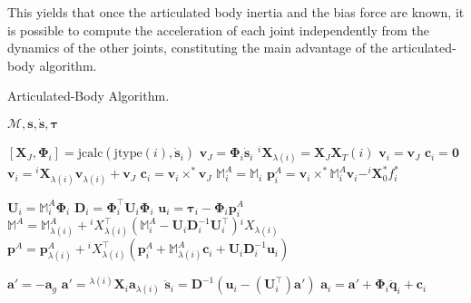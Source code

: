 This yields that once the articulated body inertia and the bias force are known, it is possible to compute the acceleration of each joint independently from the dynamics of the other joints, constituting the main advantage of the articulated-body algorithm.

\begin{algorithm}[h]
    \caption{Articulated-Body Algorithm.}
    \label{alg:aba}
    \begin{algorithmic}[1]
        \Require $\mathcal{M}, \mathbf{s}, \dot{\mathbf{s}}, \boldsymbol{\tau}$

        \State $[\mathbf{X}_J, \boldsymbol{\Phi}_i] = \text{jcalc}(\text{jtype}(i), \dot{\mathbf{s}}_i)$
        \State $\mathrm{\mathbf{v}}_J = \boldsymbol{\Phi}_i \dot{\mathbf{s}}_i$
        \State $^i\mathbf{X}_{\lambda(i)} = \mathbf{X}_J\mathbf{X}_T (i)$
        \State $\mathrm{\mathbf{v}}_i = \mathrm{\mathbf{v}}_J$
        \State $\mathbf{c}_i = \mathbf{0}$
        \Else
        \State $\mathrm{\mathbf{v}}_i = {}^i\mathbf{X} _{\lambda(i)}\mathrm{\mathbf{v}}_{\lambda(i)} + \mathrm{\mathbf{v}}_J$
        \State $\mathbf{c}_i = \mathrm{\mathbf{v}}_i \times ^* \mathrm{\mathbf{v}}_J$
        \EndIf
        \State $\mathbb{M}_i ^A = \mathbb{M}_i$
        \State $\mathbf{p}_i ^A = \mathrm{\mathbf{v}}_i \times^* \mathbb{M}_i ^A \mathrm{\mathbf{v}}_i - ^i\mathbf{X} _0 ^* f ^* _i $
        \EndFor

        \item[]

        \State $\mathbf{U}_i = \mathbb{M}_i ^A \boldsymbol{\Phi}_i$
        \State $\mathbf{D} _i = \boldsymbol{\Phi} ^\top _i  {} \mathbf{U} _i \boldsymbol{\Phi} _i $
        \State $\mathbf{u}_i = \boldsymbol{\tau}_i - \boldsymbol{\Phi}_i\mathbf{p}_i^A$
        \State $\mathbb{M} ^A = \mathbb{M} ^A _{\lambda (i)} + {} ^i X _{\lambda (i)} ^\top (\mathbb{M} _i ^A - {}  \mathbf{U} _i  \mathbf{D} ^{-1} _i  {}  \mathbf{U} ^\top _i) {} ^i X _{\lambda (i)} $
        \State $\mathbf{p} ^A = \mathbf{p} ^A _{\lambda (i)} + {} ^i X _{\lambda (i)} ^\top (\mathbf{p} ^A_i + \mathbb{M} ^A _{\lambda (i)}  \mathbf{c}_i + {}  \mathbf{U} _i \mathbf{D} ^{-1} _i {} \mathbf{u} _i) $
        \EndIf
        \EndFor

        \item[]

        \State $\mathbf{a}' = -\mathbf{a}_g$
        \Else
        \State $\mathbf{a}' = {}^{\lambda(i)}\mathbf{X}_i \mathbf{a}_{\lambda(i)}$
        \State $\ddot{\mathbf{s}}_i = \mathbf{D}^{-1} (\mathbf{u}_i - (\mathbf{U}_i^\top)\mathbf{a}')$
        \State $\mathbf{a}_i = \mathbf{a}' + \boldsymbol{\Phi}_i\mathbf{\ddot{q}}_i + \mathbf{c} _i$
        \EndIf
        \EndFor
    \end{algorithmic}
\end{algorithm}
